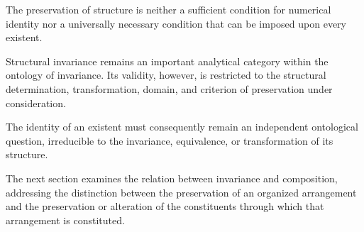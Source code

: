 The preservation of structure is neither
a sufficient condition for numerical
identity nor a universally necessary
condition that can be imposed upon
every existent.

Structural invariance remains an
important analytical category within
the ontology of invariance. Its validity,
however, is restricted to the structural
determination, transformation, domain,
and criterion of preservation under
consideration.

The identity of an existent must
consequently remain an independent
ontological question, irreducible
to the invariance, equivalence, or
transformation of its structure.

The next section examines the relation
between invariance and composition,
addressing the distinction between
the preservation of an organized
arrangement and the preservation
or alteration of the constituents
through which that arrangement
is constituted.

